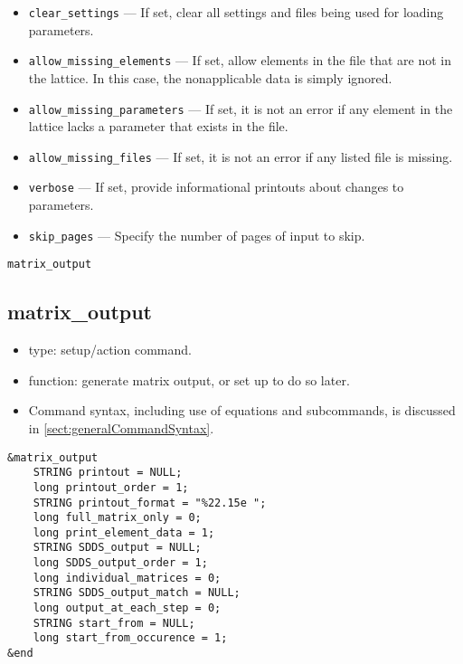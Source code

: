 \documentclass[11pt]{article}
\begin{document}
\begin{itemize}
\item \verb|clear_settings| --- If set, clear all settings and files
being used for loading parameters.

\item \verb|allow_missing_elements| --- If set, allow elements in the
file that are not in the lattice.  In this case, the nonapplicable
data is simply ignored.

\item \verb|allow_missing_parameters| --- If set, it is not an error
if any element in the lattice lacks a parameter that exists in the file.

\item \verb|allow_missing_files| --- If set, it is not an error
if any listed file is missing.

\item \verb|verbose| --- If set, provide informational printouts about
changes to parameters.

\item \verb|skip_pages| --- Specify the number of pages of input to skip.

\end{itemize}

\newpage
\begin{center}{\Large\verb|matrix_output|}\end{center}
\subsection{matrix\_output \label{subsec:matrixoutput}}

\begin{itemize}
\item type: setup/action command.
\item function: generate matrix output, or set up to do so later.
\item Command syntax, including use of equations and subcommands, is discussed in \ref{sect:generalCommandSyntax}.
\end{itemize}

\begin{verbatim}
&matrix_output
    STRING printout = NULL;
    long printout_order = 1;
    STRING printout_format = "%22.15e ";
    long full_matrix_only = 0;
    long print_element_data = 1;
    STRING SDDS_output = NULL;
    long SDDS_output_order = 1;
    long individual_matrices = 0;
    STRING SDDS_output_match = NULL;
    long output_at_each_step = 0;
    STRING start_from = NULL;
    long start_from_occurence = 1;
&end
\end{verbatim}
\end{document}
